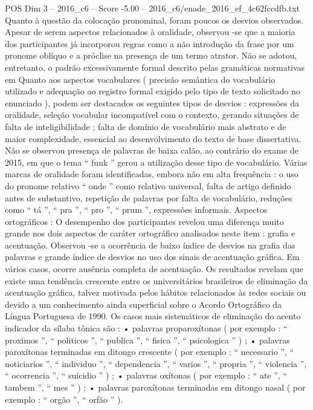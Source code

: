 \begin{textsample}{POS Dim 3 – 2016\_c6 – Score -5.00 – 2016\_c6/enade\_2016\_ef\_4c62fccdfb.txt}
Quanto à questão da colocação pronominal, foram poucos os desvios observados.
Apesar de serem aspectos relacionados à oralidade, observou -se que a maioria dos participantes já incorporou regras como a não introdução da frase por um pronome oblíquo e a próclise na presença de um termo atrator.
Não se adotou, entretanto, o padrão excessivamente formal descrito pelas gramáticas normativas em Quanto aos aspectos vocabulares ( precisão semântica do vocabulário utilizado e adequação ao registro formal exigido pelo tipo de texto solicitado no enunciado ), podem ser destacados os seguintes tipos de desvios : expressões da oralidade, seleção vocabular incompatível com o contexto, gerando situações de falta de inteligibilidade ; falta de domínio de vocabulário mais abstrato e de maior complexidade, essencial ao desenvolvimento do texto de base dissertativa.
Não se observou presença de palavras de baixa calão, ao contrário do exame de 2015, em que o tema “ funk ” gerou a utilização desse tipo de vocabulário.
Várias marcas de oralidade foram identificadas, embora não em alta frequência : o uso do pronome relativo “ onde ” como relativo universal, falta de artigo definido antes de substantivo, repetição de palavras por falta de vocabulário, reduções como “ tá ”, “ pra ”, “ pro ”, “ prum ”, expressões informais.
Aspectos ortográficos : O desempenho dos participantes revelou uma diferença muito grande nos dois aspectos de caráter ortográfico analisados neste item : grafia e acentuação.
Observou -se a ocorrência de baixo índice de desvios na grafia das palavras e grande índice de desvios no uso dos sinais de acentuação gráfica.
Em vários casos, ocorre ausência completa de acentuação.
Os resultados revelam que existe uma tendência crescente entre os universitários brasileiros de eliminação da acentuação gráfica, talvez motivada pelos hábitos relacionados às redes sociais ou devido a um conhecimento ainda superficial sobre o Acordo Ortográfico da Língua Portuguesa de 1990.
Os casos mais sistemáticos de eliminação do acento indicador da sílaba tônica são : • palavras proparoxítonas ( por exemplo : “ proximos ”, “ politicos ”, “ publica ”, “ fisica ”, “ psicologica ” ) ; • palavras paroxítonas terminadas em ditongo crescente ( por exemplo : “ necessario ”, “ noticiarios ”, “ individuo ”, “ dependencia ”, “ varios ”, “ propria ”, “ violencia ”, “ ocorrencia ”, “ suicidio ” ) ; • palavras oxítonas ( por exemplo : “ ate ”, “ tambem ”, “ mes ” ) ; • palavras paroxítonas terminadas em ditongo nasal ( por exemplo : “ orgão ”, “ orfão ” ).

\end{textsample}
